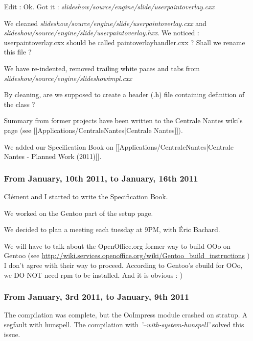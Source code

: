 \documentclass[a4paper,11pt]{article}
\begin{document}
Edit : Ok. Got it : \emph{slideshow/source/engine/slide/userpaintoverlay.cxx}

We cleaned \emph{slideshow/source/engine/slide/userpaintoverlay.cxx} and
\emph{slideshow/source/engine/slide/userpaintoverlay.hxx}.  We noticed :
userpaintoverlay.cxx should be called paintoverlayhandler.cxx ? Shall we
rename this file ?

We have re-indented, removed trailing white paces and tabs from
\emph{slideshow/source/engine/slideshowimpl.cxx}

By cleaning, are we supposed to create a header (.h) file containing
definition of the class ?

Summary from former projects have been written to the Centrale Nantes wiki's
page (see [[Applications/CentraleNantes|Centrale Nantes]]).

We added our Specification Book on [[Applications/CentraleNantes|Centrale
Nantes - Planned Work (2011)]].

\subsubsection*{From January, 10th 2011, to January, 16th 2011}

Clément and I started to write the Specification Book.

We worked on the Gentoo part of the setup page.

We decided to plan a meeting each tuesday at 9PM, with Éric Bachard.

We will have to talk about the OpenOffice.org former way to build OOo on
Gentoo (see
\url{http://wiki.services.openoffice.org/wiki/Gentoo\_build\_instructions} ) I
don't agree with their way to proceed. According to Gentoo's ebuild for OOo,
we DO NOT need rpm to be installed. And it is obvious :-)

\subsubsection*{From January, 3rd 2011, to January, 9th 2011}

The compilation was complete, but the OoImpress module crashed on stratup. A
segfault with hunspell.  The compilation with \emph{'--with-system-hunspell'}
solved this issue.


\newpage
{}
\end{document}
